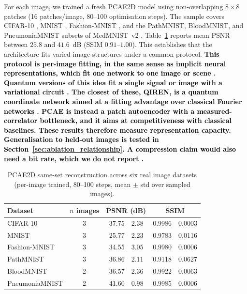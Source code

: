 \documentclass[pdflatex,sn-basic]{sn-jnl}
\newcommand{\add}[1]{\textbf{\textcolor{black}{#1}}}
\begin{document}
For each image, we trained a fresh PCAE2D model using non-overlapping $8\times8$
patches (16 patches/image, 80--100 optimisation steps). The sample covers
CIFAR-10 \citep{Krizhevsky2009}, MNIST \citep{LeCun1998}, Fashion-MNIST
\citep{Xiao2017}, and the PathMNIST, BloodMNIST, and PneumoniaMNIST subsets of
MedMNIST~v2 \citep{Yang2023}. Table~\ref{tab:sameset_multi_dataset} reports mean
PSNR between $25.8$ and $41.6$~dB (SSIM $0.91$--$1.00$). This establishes that
the architecture fits varied image structures under a common protocol.
\add{This protocol is per-image fitting, in the same sense as implicit neural
representations, which fit one network to one image or scene
\citep{Ulyanov2020DIP, Sitzmann2020, Tancik2020, Mildenhall2020NeRF,
Dupont2021COIN, Strumpler2022}. Quantum versions of this idea fit a single
signal or image with a variational circuit \citep{Zhao2024QIREN,
Fujihashi2024QINC, LizzioBosco2026QISR}. The closest of these, QIREN, is a
quantum coordinate network aimed at a fitting advantage over classical Fourier
networks \citep{Zhao2024QIREN}. PCAE is instead a patch autoencoder with a
measured-correlator bottleneck, and it aims at competitiveness with classical
baselines. These results therefore measure representation capacity.
Generalisation to held-out images is tested in
Section~\ref{sec:ablation_relationship}. A compression claim would also need a bit
rate, which we do not report \citep{Dupont2021COIN, Strumpler2022}.}

\begin{table}[t]
  \centering
  \caption{PCAE2D same-set reconstruction across six real image datasets
           (per-image trained, 80--100 steps, mean $\pm$ std over sampled
           images).}
  \label{tab:sameset_multi_dataset}
  \begin{tabular}{@{}l c r@{\,$\pm$\,}l r@{\,$\pm$\,}l@{}}
    \toprule
    Dataset          & $n$ images & \multicolumn{2}{c}{PSNR (dB)} & \multicolumn{2}{c}{SSIM} \\
    \midrule
    CIFAR-10         & 3 & 37.75 & 2.38 & 0.9986 & 0.0003 \\
    MNIST            & 3 & 25.77 & 2.23 & 0.9783 & 0.0116 \\
    Fashion-MNIST    & 3 & 34.55 & 3.05 & 0.9980 & 0.0006 \\
    PathMNIST        & 3 & 36.86 & 2.11 & 0.9118 & 0.0627 \\
    BloodMNIST       & 2 & 36.57 & 2.36 & 0.9922 & 0.0063 \\
    PneumoniaMNIST   & 2 & 41.60 & 0.98 & 0.9985 & 0.0006 \\
    \bottomrule
  \end{tabular}
\end{table}
\end{document}
